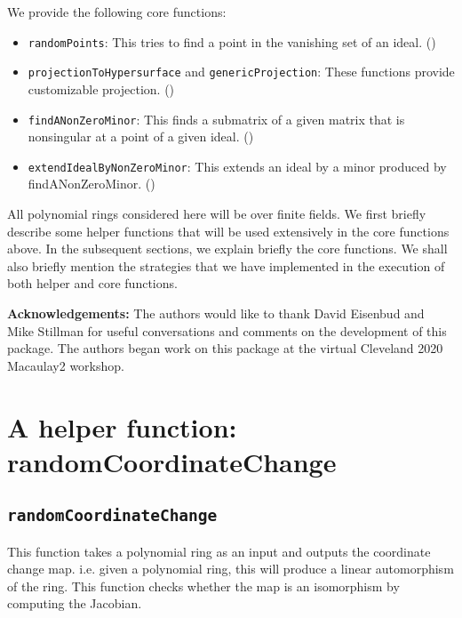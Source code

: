 \documentclass[11pt]{amsart}
\theoremstyle{definition}
\begin{document}
 We provide the following core functions:
 \begin{itemize}
	\item {\tt randomPoints}:  This tries to find a point in the vanishing set of an ideal. ()
 	\item {\tt projectionToHypersurface} and {\tt genericProjection}: These functions provide customizable projection. () 	
    \item {\tt findANonZeroMinor}:  This finds a submatrix of a given matrix that is nonsingular at a point of a given ideal. ()          
	\item {\tt extendIdealByNonZeroMinor}:  This extends an ideal by a minor produced by findANonZeroMinor. ()	
 \end{itemize}
 
All polynomial rings considered here will be over finite fields. We first briefly describe some helper functions that will be used extensively in the core functions above. In the subsequent sections, we explain briefly the core functions. We shall also briefly mention the strategies that we have implemented in the execution of both helper and core functions.

\vspace{1em}
\noindent \textbf{Acknowledgements:} The authors would like to thank David Eisenbud and Mike Stillman for useful conversations and comments on the development of this package.  The authors began work on this package at the virtual Cleveland 2020 Macaulay2 workshop.

\section{A helper function: randomCoordinateChange}{\label{helper}}




\subsection*{\tt randomCoordinateChange} This function takes a polynomial ring as an input and outputs the coordinate change map.  
	i.e. given a polynomial ring, this will produce a linear automorphism of the ring.  This function checks whether the map is an isomorphism by computing the Jacobian.
	
\end{document}
